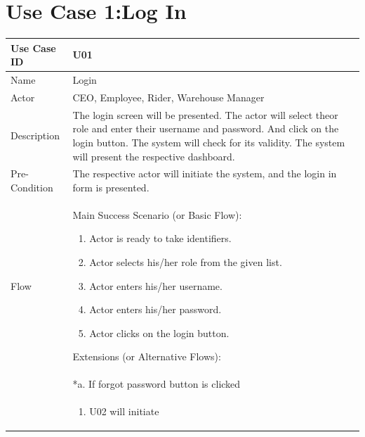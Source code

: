 \documentclass[12pt,a4paper]{report}
\begin{document}
\section{Use Case 1:Log In}
\begin{tabular}{ | m{3cm} | m{12cm}| } \hline
Use Case ID & U01   \\\hline
Name  &  Login \\ \hline
Actor &   CEO, Employee, Rider, Warehouse Manager \\ \hline
Description & The login screen will be presented. The actor will select theor role and enter their username and password. And click on the login button. The system will check for its validity. The system will present the respective dashboard.
\\ \hline
Pre-Condition & The respective actor will initiate the system, and the login in form is presented.  \\
\hline
Flow & Main Success Scenario (or Basic Flow):
\begin{enumerate}
\item Actor is ready to take identifiers.
\item Actor selects his/her role from the given list.   
\item Actor enters his/her username.
\item Actor enters his/her password.
\item Actor clicks on the login button. 
\end{enumerate}
Extensions (or Alternative Flows):\\
& *a. If forgot password button is clicked \\
& \begin{enumerate}
		\item U02 will initiate
	\end{enumerate}
\\\hline
\end{tabular}
\end{document}
